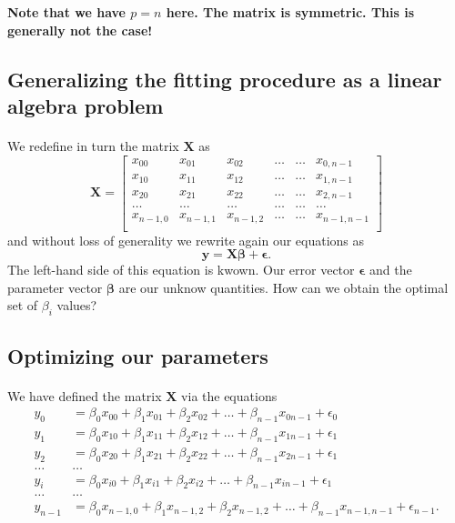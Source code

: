 \documentclass[%
oneside,                 %
final,                   %
10pt]{article}
\begin{document}
\textbf{Note that we have $p=n$ here. The matrix is symmetric. This is generally not the case!}




\subsection*{Generalizing the fitting procedure as a linear algebra problem}

\paragraph{}
We redefine in turn the matrix $\bm{X}$ as
\[
\bm{X}=
\begin{bmatrix} 
x_{00}& x_{01} &x_{02}& \dots & \dots &x_{0,n-1}\\
x_{10}& x_{11} &x_{12}& \dots & \dots &x_{1,n-1}\\
x_{20}& x_{21} &x_{22}& \dots & \dots &x_{2,n-1}\\                      
\dots& \dots &\dots& \dots & \dots &\dots\\
x_{n-1,0}& x_{n-1,1} &x_{n-1,2}& \dots & \dots &x_{n-1,n-1}\\
\end{bmatrix} 
\]
and without loss of generality we rewrite again  our equations as
\[
\bm{y} = \bm{X}\bm{\beta}+\bm{\epsilon}.
\]
The left-hand side of this equation is kwown. Our error vector $\bm{\epsilon}$ and the parameter vector $\bm{\beta}$ are our unknow quantities. How can we obtain the optimal set of $\beta_i$ values?




\subsection*{Optimizing our parameters}

\paragraph{}
We have defined the matrix $\bm{X}$ via the equations
\begin{align*}
y_0&=\beta_0x_{00}+\beta_1x_{01}+\beta_2x_{02}+\dots+\beta_{n-1}x_{0n-1}+\epsilon_0\\
y_1&=\beta_0x_{10}+\beta_1x_{11}+\beta_2x_{12}+\dots+\beta_{n-1}x_{1n-1}+\epsilon_1\\
y_2&=\beta_0x_{20}+\beta_1x_{21}+\beta_2x_{22}+\dots+\beta_{n-1}x_{2n-1}+\epsilon_1\\
\dots & \dots \\
y_{i}&=\beta_0x_{i0}+\beta_1x_{i1}+\beta_2x_{i2}+\dots+\beta_{n-1}x_{in-1}+\epsilon_1\\
\dots & \dots \\
y_{n-1}&=\beta_0x_{n-1,0}+\beta_1x_{n-1,2}+\beta_2x_{n-1,2}+\dots+\beta_{n-1}x_{n-1,n-1}+\epsilon_{n-1}.\\
\end{align*}
\end{document}

